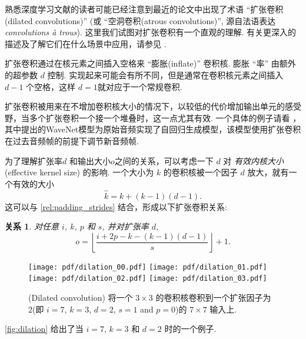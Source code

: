 \documentclass[notitlepage]{ctexrep}
\newtheorem{relationship}{关系}
\begin{document}
熟悉深度学习文献的读者可能已经注意到最近的论文中出现了术语
``扩张卷积(dilated convolutions)'' (或 ``空洞卷积(atrous convolutions)'', 源自法语表达{\em convolutions \`{a} trous}). 这里我们试图对扩张卷积有一个直观的理解. 有关更深入的描述及了解它们在什么场景中应用，请参见 \citet{chen2014semantic,yu2015multi}.

扩张卷积通过在核元素之间插入空格来 ``膨胀(inflate)'' 卷积核. 膨胀 ``率'' 由额外的超参数 $d$ 控制. 实现起来可能会有所不同，但是通常在卷积核元素之间插入 $d - 1$
个空格，这样 $d = 1$就对应于一个常规卷积.

扩张卷积被用来在不增加卷积核大小的情况下，以较低的代价增加输出单元的感受野，当多个扩张卷积一个接一个堆叠时，这一点尤其有效. 一个具体的例子请看 \citet{oord2016wavenet}，其中提出的WaveNet模型为原始音频实现了自回归生成模型，该模型使用扩张卷积在过去音频帧的前提下调节新音频帧.

为了理解扩张率$d$ 和输出大小$o$之间的关系，可以考虑一下 $d$ 对 {\em 有效内核大小}(effective kernel
size) 的影响. 一个大小为 $k$ 的卷积核被一个因子 $d$ 放大，就有一个有效的大小
\begin{equation*}
    \hat{k} = k + (k - 1)(d - 1).
\end{equation*}
这可以与 \autoref{rel:padding_strides} 结合，形成以下扩张卷积关系:

\begin{relationship}\label{rel:dilation}
对任意 $i$, $k$, $p$ 和 $s$, 并对扩张率 $d$,
\begin{equation*}
    o = \left\lfloor \frac{i + 2p - k - (k - 1)(d - 1)}{s} \right\rfloor + 1.
\end{equation*}
\end{relationship}

\begin{figure}[h]
    \centering
    \texttt{[image: pdf/dilation\_00.pdf]}
    \texttt{[image: pdf/dilation\_01.pdf]}
    \texttt{[image: pdf/dilation\_02.pdf]}
    \texttt{[image: pdf/dilation\_03.pdf]}
    \caption{\label{fig:dilation} (Dilated convolution)
    将一个 $3 \times 3$ 的卷积核卷积到一个扩张因子为2(即 $i = 7$, $k = 3$, $d = 2$, $s = 1$ and $p = 0$)的 $7 \times 7$ 输入上.}
\end{figure}

\noindent \autoref{fig:dilation} 给出了当 $i = 7$, $k = 3$ 和
$d = 2$ 时的一个例子.



\end{document}
